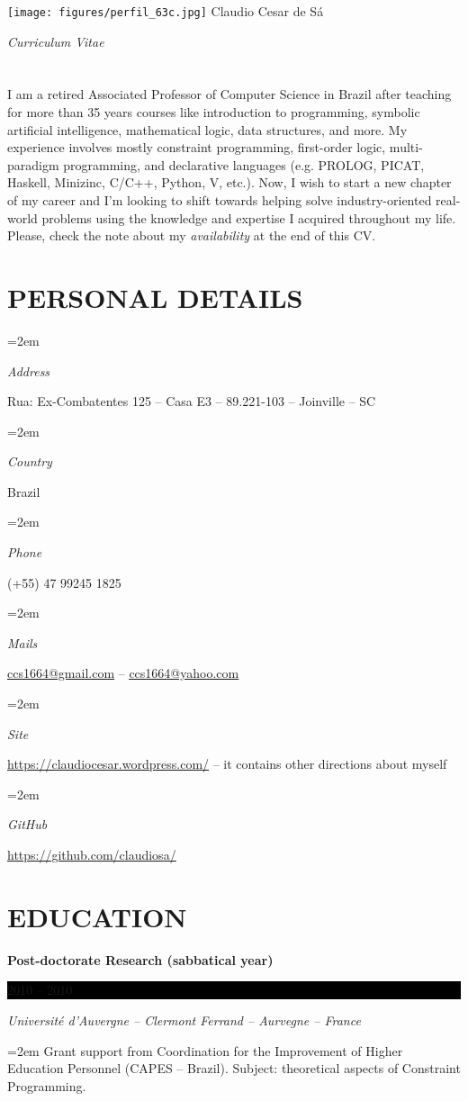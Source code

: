 \documentclass[paper=a4,fontsize=11pt]{scrartcl} %
\newlength{\spacebox}
\newcommand{\sepspace}{\vspace*{0.8em}}		%
\newcommand{\MyName}[1]{ %
		\Huge \usefont{OT1}{phv}{b}{n} \hfill #1
		\par \normalsize \normalfont}
\newcommand{\MySlogan}[1]{ %
		\large \usefont{OT1}{phv}{m}{n}\hfill \textit{#1}
		\par \normalsize \normalfont}
\newcommand{\NewPart}[1]{\section*{\uppercase{#1}}}
\newcommand{\PersonalEntry}[2]{
		\noindent\hangindent=2em\hangafter=0 %
		\parbox{\spacebox}{        %
		\textit{#1}}		       %
		\hspace{1.5em} #2 \par}    %
\newcommand{\EducationEntry}[4]{
		\noindent \textbf{#1} \hfill      %
		\colorbox{Black}{%
			\parbox{6em}{%
			\hfill\color{White}#2}} \par  %
		\noindent \textit{#3} \par        %
		\noindent\hangindent=2em\hangafter=0 \small #4 %
		\normalsize \par}
\begin{document}
\vspace*{-3em}
		\texttt{[image: figures/perfil\_63c.jpg]}
\vspace{-1.5cm}
\MyName{Claudio Cesar de Sá}
\MySlogan{Curriculum Vitae}


\sepspace

\NewPart{}{}

I am a retired Associated Professor of Computer Science in Brazil after teaching for more than 35 years courses like introduction to programming, symbolic artificial intelligence, mathematical logic, data structures, and more. My experience involves mostly constraint programming, first-order logic, multi-paradigm programming, and declarative languages (e.g. PROLOG, PICAT, Haskell, Minizinc, C/C++, Python, V, etc.). Now, I wish to start a new chapter of my career and I'm looking to shift towards helping solve industry-oriented real-world problems using the knowledge and expertise I acquired throughout my life. Please, check the note about my {\em availability} at the end of this CV.
\sepspace

\NewPart{Personal details}{}

\PersonalEntry{Address}{Rua: Ex-Combatentes 125 -- Casa E3 -- 89.221-103 -- Joinville -- SC}
\PersonalEntry{Country}{Brazil}
\PersonalEntry{Phone}{(+55) 47 99245 1825}
\PersonalEntry{Mails}{\underline{\url{ccs1664@gmail.com}} -- \underline{\url{ccs1664@yahoo.com}}} \vspace{2mm}
\PersonalEntry{Site}{\underline{\url{https://claudiocesar.wordpress.com/}} \hfill -- it contains other directions about myself}
\PersonalEntry{GitHub}{\underline{\url{https://github.com/claudiosa/}}}

\NewPart{Education}{}


\EducationEntry{Post-doctorate Research (sabbatical year)}{2010 -- 2010}{Université d'Auvergne -- Clermont Ferrand -- Aurvegne -- France}{Grant support from  Coordination for the Improvement of Higher Education Personnel (CAPES -- Brazil). Subject: theoretical aspects of Constraint Programming.}
\sepspace
\end{document}
